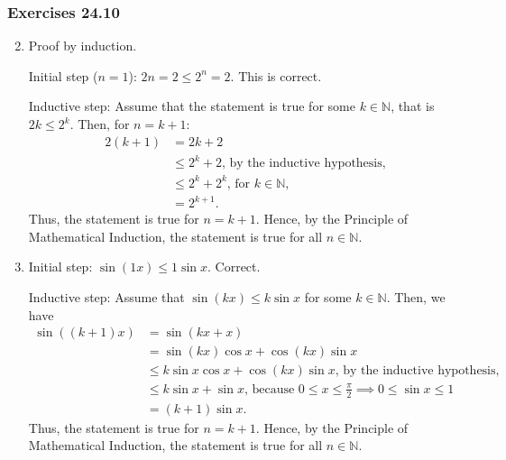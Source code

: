 \documentclass{article}
\newcommand{\inN}{\in\mathbb{N}}
\begin{document}
\subsubsection*{Exercises 24.10}
\begin{enumerate}[label=(\roman*)]
    \setcounter{enumi}{1}
  \item Proof by induction.

    Initial step ($n=1$): $2n=2\le2^n=2$. This is correct.

    Inductive step: Assume that the statement is true for some $k\in\mathbb{N}$, that is $2k\le2^k$.
    Then, for $n=k+1$:
    \begin{align*}
      2(k+1) & = 2k+2 \\
      & \le 2^k+2\text{, by the inductive hypothesis,} \\
      & \le 2^k+2^k\text{, for $k\in\mathbb{N}$,} \\
      & = 2^{k+1}.
    \end{align*}
    Thus, the statement is true for $n=k+1$. Hence, by the Principle of Mathematical Induction, the
    statement is true for all $n\in\mathbb{N}$.
    \setcounter{enumi}{4}
  \item Initial step: $\sin(1x)\le1\sin{x}$. Correct.

    Inductive step: Assume that $\sin(kx) \le k\sin{x}$ for some $k\inN$. Then, we have
    \begin{align*}
      \sin\left((k+1)x\right) & = \sin(kx+x) \\
      & = \sin(kx)\cos{x}+\cos(kx)\sin{x} \\
      & \le k\sin{x}\cos{x}+\cos(kx)\sin{x}\text{, by the inductive hypothesis,} \\
      & \le k\sin{x}+\sin{x}\text{, because $0 \le x \le \frac{\pi}{2}\implies0\le\sin{x}\le1$} \\
      & = (k+1)\sin{x}.
    \end{align*}
    Thus, the statement is true for $n=k+1$. Hence, by the Principle of Mathematical Induction, the
    statement is true for all $n\in\mathbb{N}$.
\end{enumerate}
\end{document}
